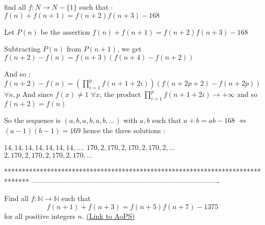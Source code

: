 \begin{solution}
	\begin{tcolorbox}find all $ f: N \to N - \{1\}$ such that :
$ f(n) + f(n + 1) = f(n + 2)f(n + 3) - 168$\end{tcolorbox}

Let $ P(n)$ be the assertion $ f(n) + f(n + 1) = f(n + 2)f(n + 3) - 168$

Subtracting $ P(n)$ from $ P(n+1)$, we get $ f(n+2)-f(n)=f(n+3)(f(n+4)-f(n+2))$

And so : $ f(n+2)-f(n)=\left(\prod_{i=1}^pf(n+1+2i)\right)(f(n+2p+2)-f(n+2p))$ $ \forall n,p$
And since $ f(x)\ne 1$ $ \forall x$, the product $ \prod_{i=1}^pf(n+1+2i)\to+\infty$ and so $ f(n+2)=f(n)$

So the sequence is $ (a,b,a,b,a,b,...)$ with $ a,b$ such that $ a+b=ab-168$ $ \iff$ $ (a-1)(b-1)=169$ hence the three solutions :

$ 14,14,14,14,14,14,14,....$
$ 170,2,170,2,170,2,170,2,...$
$ 2,170,2,170,2,170,2,170,...$
\end{solution}
*******************************************************************************
-------------------------------------------------------------------------------

\begin{problem}
	Find all $f: \mathbb N \to \mathbb N$ such that
\[f(n+1)+f(n+3)=f(n+5)f(n+7)-1375\]
for all positive integers $n$.
	\flushright \href{https://artofproblemsolving.com/community/c6h311580}{(Link to AoPS)}
\end{problem}



